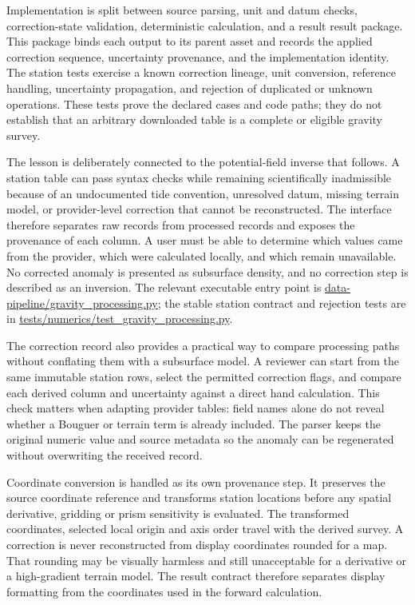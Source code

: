 Implementation is split between source parsing, unit and datum checks,
correction-state validation, deterministic calculation, and a result
result package. This package binds each output to its parent asset and records
the applied correction sequence, uncertainty provenance, and the
implementation identity. The station tests exercise a known correction
lineage, unit conversion, reference handling, uncertainty propagation,
and rejection of duplicated or unknown operations. These tests prove
the declared cases and code paths; they do not establish that an
arbitrary downloaded table is a complete or eligible gravity survey.

The lesson is deliberately connected to the potential-field inverse
that follows. A station table can pass syntax checks while remaining
scientifically inadmissible because of an undocumented tide convention,
unresolved datum, missing terrain model, or provider-level correction
that cannot be reconstructed. The interface therefore separates raw
records from processed records and exposes the provenance of each
column. A user must be able to determine which values came from the
provider, which were calculated locally, and which remain unavailable.
No corrected anomaly is presented as subsurface density, and no
correction step is described as an inversion. The relevant executable
entry point is \url{data-pipeline/gravity_processing.py}; the stable
station contract and rejection tests are in
\url{tests/numerics/test_gravity_processing.py}.

The correction record also provides a practical way to compare
processing paths without conflating them with a subsurface model. A
reviewer can start from the same immutable station rows, select the
permitted correction flags, and compare each derived column and
uncertainty against a direct hand calculation. This check matters when
adapting provider tables: field names alone do not reveal whether a
Bouguer or terrain term is already included. The parser keeps the
original numeric value and source metadata so the anomaly can be
regenerated without overwriting the received record.

Coordinate conversion is handled as its own provenance step. It
preserves the source coordinate reference and transforms station
locations before any spatial derivative, gridding or prism sensitivity
is evaluated. The transformed coordinates, selected local origin and
axis order travel with the derived survey. A correction is never
reconstructed from display coordinates rounded for a map. That rounding
may be visually harmless and still unacceptable for a derivative or a
high-gradient terrain model. The result contract therefore separates
display formatting from the coordinates used in the forward
calculation.


